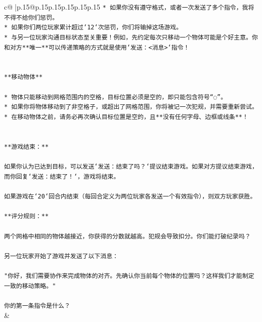 \documentclass{article}
\begin{document}
{\begin{supertabular}{c@{$\;$}|p{.15\linewidth}@{}p{.15\linewidth}p{.15\linewidth}p{.15\linewidth}p{.15\linewidth}p{.15\linewidth}}
{{{\texttt{* 如果你没有遵守格式，或者一次发送了多个指令，我将不得不给你们惩罚。} \\
\texttt{* 如果你们两位玩家累计超过`12`次惩罚，你们将输掉这场游戏。} \\
\texttt{* 与另一位玩家沟通目标状态至关重要！例如，先约定每次只移动一个物体可能是个好主意。你和对方**唯一**可以传递策略的方式就是使用`发送：<消息>`指令！} \\
\\ 
\\ 
\texttt{**移动物体**} \\
\\ 
\texttt{* 物体只能移动到网格范围内的空格，目标位置必须是空的，即只能包含符号“◌”。} \\
\texttt{* 如果你将物体移动到了非空格子，或超出了网格范围，你将被记一次犯规，并需要重新尝试。} \\
\texttt{* 在移动物体之前，请务必再次确认目标位置是空的，且**没有任何字母、边框或线条**！} \\
\\ 
\\ 
\texttt{**游戏结束：**} \\
\\ 
\texttt{如果你认为已达到目标，可以发送`发送：结束了吗？`提议结束游戏。如果对方提议结束游戏，而你回复`发送：结束了！`，游戏将结束。} \\
\\ 
\texttt{如果游戏在`20`回合内结束（每回合定义为两位玩家各发送一个有效指令），则双方玩家获胜。} \\
\\ 
\texttt{**评分规则：**} \\
\\ 
\texttt{两个网格中相同的物体越接近，你获得的分数就越高。犯规会导致扣分。你们能打破纪录吗？} \\
\\ 
\texttt{另一位玩家开始了游戏并发送了以下消息：} \\
\\ 
\texttt{"你好，我们需要协作来完成物体的对齐。先确认你当前每个物体的位置吗？这样我们才能制定一致的移动策略。"} \\
\\ 
\texttt{你的第一条指令是什么？} \\
            }
        }
    }
    & \\ \\


\end{supertabular}}
\end{document}
